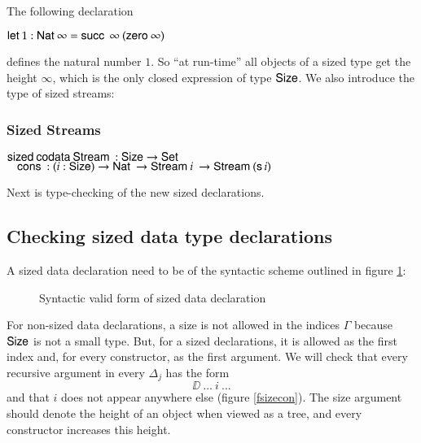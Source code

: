 \noindent The following declaration
\begin{bsp}
$\mathsf{let}\: 1 : \mathsf{Nat}\: \infty = \mathsf{succ}\: \: \infty \: (\mathsf{zero}\: \infty)$ 
\end{bsp}
\noindent defines the natural number $1$. So ``at run-time'' all objects of a sized type get the height $\infty$,
which is the only closed expression of type $\mathsf{Size}$. We also introduce the type of sized streams:
\subsubsection{Sized Streams}
\begin{bsp}
$\mathsf{sized}\: \mathsf{codata}\: \mathsf{Stream}\: : \mathsf{Size} \rightarrow \mathsf{Set} $ \\
$\hspace*{3mm} \mathsf{cons}\: : ( i : \mathsf{Size} ) \rightarrow{\mathsf{Nat}\:\rightarrow\mathsf{Stream}\:i \: \rightarrow\mathsf{Stream}\:(\mathsf{s}\,i) } $
\end{bsp}
Next is type-checking of the new sized declarations. 
\subsection{Checking sized data type declarations}

A sized data declaration need to be of the syntactic scheme outlined in figure \ref{ssyn}:

\begin{figure}[htp]
\caption{Syntactic valid form of sized data declaration}
\label{ssyn}
\end{figure}

\noindent For non-sized data declarations, a size is not allowed in the indices $\Gamma$ because $\mathsf{Size}$ is not a small type.
But, for a sized declarations, it is allowed as the first index and, for every constructor, as the first argument.
We will check that every recursive argument in every $\Delta_j$ has the form \[\DD \: \ldots \: i \: \ldots \]
and that $i$ does not appear anywhere else (figure \ref{fsizecon}). The size argument should denote the height of an object when viewed as a tree, and every constructor increases this height.

